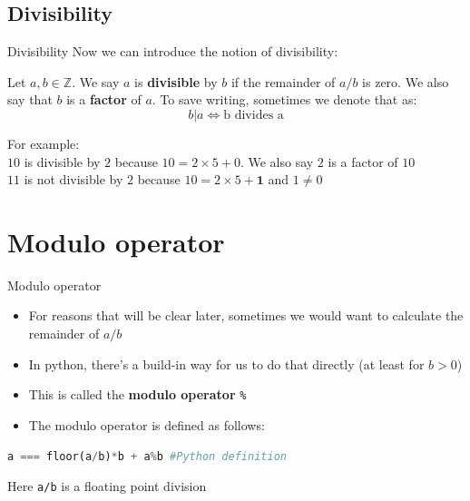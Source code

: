 \documentclass[10pt,xcolor={table,dvipsnames},t]{beamer}
\begin{document}
\subsection{Divisibility}
\begin{frame}{Divisibility}
  Now we can introduce the notion of divisibility:
  \begin{definition}
    Let $a,b \in \mathbb{Z}$. We say $a$ is \textbf{divisible} by $b$ if the remainder of $a/b$ is zero. We also say that $b$ is a \textbf{factor} of $a$. To save writing, sometimes we denote that as:
    \begin{equation}
      b|a \iff \text{b divides a}
    \end{equation}
    
    \vspace{1mm}
    For example:\\
    $10$ is divisible by $2$ because $10 = 2 \times 5 + 0$. We also say $2$ is a factor of $10$\\
    $11$ is not divisible by $2$ because $10 = 2 \times 5 + \mathbf{1}$ and $1\neq 0$
  \end{definition}
\end{frame}

\section{Modulo operator}

\begin{frame}[fragile]{Modulo operator}
  \begin{itemize}
    \item For reasons that will be clear later, sometimes we would want to calculate the remainder of $a/b$
    \item In python, there's a build-in way for us to do that directly (at least for $b>0$) 
    \item This is called the \textbf{modulo operator} \texttt{\%} 
    \item The modulo operator is defined as follows:
  \end{itemize}
\begin{lstlisting}[language=python]
  a === floor(a/b)*b + a%b #Python definition
\end{lstlisting}
Here \texttt{a/b} is a floating point division
\end{frame}
\end{document}
